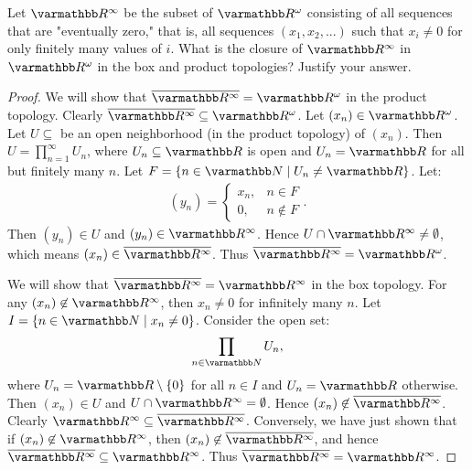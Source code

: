 \documentclass[10pt,twoside,openany]{memoir}
\begin{document}
\begin{problem}[manual-num={19.7}]
Let $\bfR^\infty$ be the subset of $\bfR^\omega$ consisting of all sequences that are "eventually zero," that is, all sequences $(x_1,x_2,...)$ such that $x_i \neq 0$ for only finitely many values of $i$. What is the closure of $\bfR^\infty$ in $\bfR^\omega$ in the box and product topologies? Justify your answer.
\end{problem}
    \begin{proof}
        We will show that $\overline{\bfR^\infty} = \bfR^\omega$ in the product topology. Clearly $\overline{\bfR^\infty} \subseteq \bfR^\omega$. Let $(x_n) \in \bfR^\omega$. Let $U \subseteq$ be an open neighborhood (in the product topology) of $(x_n)$. Then $U = \prod_{n = 1}^\infty U_n$, where $U_n \subseteq \bfR$ is open and $U_n = \bfR$ for all but finitely many $n$. Let $F =\{n \in \bfN \mid U_n \neq \bfR\}$. Let:
            \begin{equation*}
            \begin{split}
                (y_n) = \begin{cases}
                x_n,& n \in F \\
                0,& n\not\in F
                \end{cases}.
            \end{split}
            \end{equation*}
        Then $(y_n) \in U$ and $(y_n) \in \bfR^\infty$. Hence $U \cap \bfR^\infty \neq \emptyset$, which means $(x_n) \in \overline{\bfR^\infty}$. Thus $\overline{\bfR^\infty} = \bfR^\omega$.
        
        We will show that $\overline{\bfR^\infty} = \bfR^\infty$ in the box topology. For any $(x_n) \not\in \bfR^\infty$, then $x_n \neq 0$ for infinitely many $n$. Let $I = \{n \in \bfN \mid x_n \neq 0\}$. Consider the open set:
            \begin{equation*}
            \begin{split}
                \prod_{n \in \bfN}U_n,
            \end{split}
            \end{equation*}
        where $U_n = \bfR \setminus \{0\}$ for all $n \in I$ and $U_n = \bfR$ otherwise. Then $(x_n) \in U$ and $U \cap \bfR^\infty = \emptyset$. Hence $(x_n) \not\in \overline{\bfR^\infty}$. Clearly $\bfR^\infty \subseteq \overline{\bfR^\infty}$. Conversely, we have just shown that if $(x_n) \not\in \bfR^\infty$, then $(x_n) \not\in \overline{\bfR^\infty}$, and hence $\overline{\bfR^\infty} \subseteq \bfR^\infty$. Thus $\overline{\bfR^\infty} = \bfR^\infty$.
    \end{proof}
\end{document}
